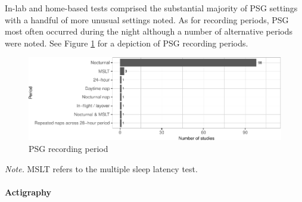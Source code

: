 \documentclass[
]{article}
\begin{document}
In-lab and home-based tests comprised the substantial majority of PSG settings with a handful of more unusual settings noted. As for recording periods, PSG most often occurred during the night although a number of alternative periods were noted. See Figure \ref{fig:period} for a depiction of PSG recording periods.

\begin{figure}
\centering
\includegraphics{review_markdown_files/figure-latex/period-1.pdf}
\caption{\label{fig:period}PSG recording period}
\end{figure}

\emph{Note.} MSLT refers to the multiple sleep latency test.

\paragraph{Actigraphy}\label{actigraphy}
\end{document}
